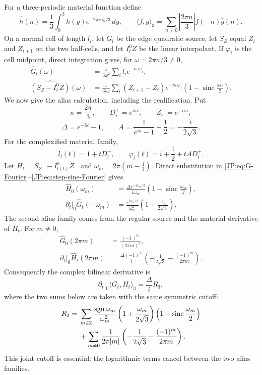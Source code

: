 \documentclass[11pt]{amsart}
\numberwithin{equation}{section}
\theoremstyle{definition}
\theoremstyle{remark}
\begin{document}
\iffalse
For a three-periodic material function define
\[
 \widehat h(n)=\frac13\int_0^3h(y)e^{-2\pi iny/3}\,dy,
 \qquad
 \langle f,g\rangle_3
 =\sum_{n\ne0}\left|\frac{2\pi n}{3}\right|
       \widehat f(-n)\widehat g(n).
\]
On a normal cell of length $l_i$, let $G_l$ be the edge quadratic
source, let $S_Z$ equal $Z_i$ and $Z_{i+1}$ on the two half-cells, and let
$I_l^0Z$ be the linear interpolant.  If $\varphi_i$ is the cell midpoint,
direct integration gives, for $\omega=2\pi n/3\ne0$,
\begin{align}
 \widehat G_l(\omega)
 &=\frac1{3\omega^2}\sum_i l_i e^{-i\omega\varphi_i},\label{JP:eq:G-Fourier}\\
 \widehat{(S_Z-I_l^0Z)}(\omega)
 &=\frac1{3i\omega}\sum_i(Z_{i+1}-Z_i)e^{-i\omega\varphi_i}
 \left(1-\operatorname{sinc}\frac{\omega l_i}{2}\right).
 \label{JP:eq:step-sine-Fourier}
\end{align}
We now give the alias calculation, including the realification.  Put
\[
 \kappa=\frac{2\pi}{3},\qquad
 D_i^+=e^{i\kappa i},\qquad Z_i^-=e^{-i\kappa i},
\]
\[
 \Delta=e^{-i\kappa}-1,\qquad
 A=\frac1{e^{i\kappa}-1}+\frac12=-\frac{i}{2\sqrt3}.
\]
For the complexified material family,
\[
 l_i(t)=1+tD_i^+,\qquad
 \varphi_i(t)=i+\frac12+tAD_i^+.
\]
Let $H_t=S_{Z^-}-I_{l(t)}^0Z^-$ and
$\omega_m=2\pi(m-\frac13)$.  Direct substitution in
\eqref{JP:eq:G-Fourier}--\eqref{JP:eq:step-sine-Fourier} gives
\begin{align}
 \widehat H_0(\omega_m)
 &=\frac{\Delta e^{-i\omega_m/2}}{i\omega_m}
 \left(1-\operatorname{sinc}\frac{\omega_m}{2}\right),
 \label{JP:eq:R3-H-first}\\
 \left.\partial_t\right|_0\widehat G_t(-\omega_m)
 &=\frac{e^{i\omega_m/2}}{\omega_m^2}
 \left(1+\frac{\omega_m}{2\sqrt3}\right).
 \label{JP:eq:R3-G-first}
\end{align}
The second alias family comes from the regular source and the material
derivative of $H_t$.  For $m\ne0$,
\begin{align}
 \widehat G_0(2\pi m)&=\frac{(-1)^m}{(2\pi m)^2},
 \label{JP:eq:R3-G-second}\\
 \left.\partial_t\right|_0\widehat H_t(2\pi m)
 &=\frac{\Delta(-1)^m}{i}
 \left(-\frac1{2\sqrt3}-\frac{(-1)^m}{2\pi m}\right).
 \label{JP:eq:R3-H-second}
\end{align}
Consequently the complex bilinear derivative is
\begin{equation}\label{JP:eq:R3-alias-complex}
 \left.\partial_t\right|_0\langle G_t,H_t\rangle_3
 =\frac{\Delta}{i}R_3,
\end{equation}
where the two sums below are taken with the same symmetric cutoff:
\begin{align}
 R_3={}&
 \sum_{m\in\mathbb Z}
 \frac{\operatorname {sgn}\omega_m}{\omega_m^2}
 \left(1+\frac{\omega_m}{2\sqrt3}\right)
 \left(1-\operatorname{sinc}\frac{\omega_m}{2}\right)
 \notag\\
 &+\sum_{m\ne0}\frac1{2\pi|m|}
 \left(-\frac1{2\sqrt3}-\frac{(-1)^m}{2\pi m}\right).
 \label{JP:eq:R3-alias-sum}
\end{align}
This joint cutoff is essential: the logarithmic terms cancel between the
two alias families.
\end{document}
